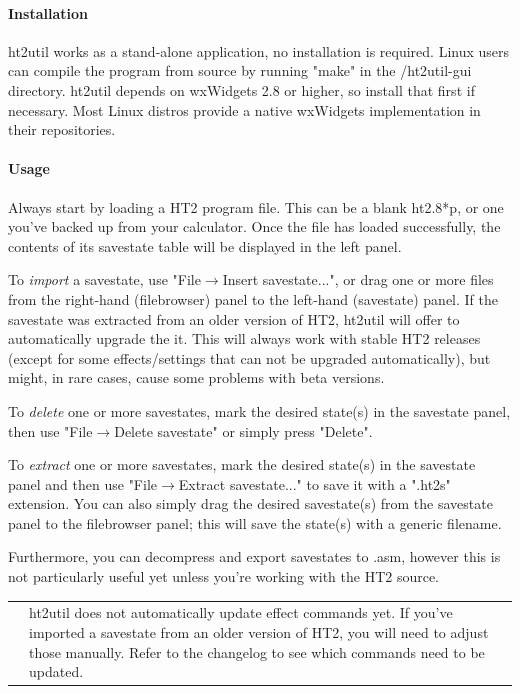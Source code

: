 \documentclass[12pt]{report}	%
\newcommand*{\TakeFourierOrnament}[1]{{%
\fontencoding{U}\fontfamily{futs}\selectfont\char#1}}
\newcommand*{\danger}{\TakeFourierOrnament{66}}
\begin{document}
\paragraph{Installation} ht2util works as a stand-alone application, no installation is required. Linux users can compile the program from source by running "make" in the /ht2util-gui directory. ht2util depends on wxWidgets 2.8 or higher, so install that first if necessary. Most Linux distros provide a native wxWidgets implementation in their repositories.

\paragraph{Usage} Always start by loading a HT2 program file. This can be a blank ht2.8*p, or one you've backed up from your calculator. Once the file has loaded successfully, the contents of its savestate table will be displayed in the left panel.

To \emph{import} a savestate, use "File$\rightarrow$Insert savestate...", or drag one or more files from the right-hand (filebrowser) panel to the left-hand (savestate) panel. If the savestate was extracted from an older version of HT2, ht2util will offer to automatically upgrade the it. This will always work with stable HT2 releases (except for some effects/settings that can not be upgraded automatically), but might, in rare cases, cause some problems with beta versions.

To \emph{delete} one or more savestates, mark the desired state(s) in the savestate panel, then use "File$\rightarrow$Delete savestate" or simply press "Delete".

To \emph{extract} one or more savestates, mark the desired state(s) in the savestate panel and then use "File$\rightarrow$Extract savestate..." to save it with a ".ht2s" extension. You can also simply drag the desired savestate(s) from the savestate panel to the filebrowser panel; this will save the state(s) with a generic filename.

Furthermore, you can decompress and export savestates to .asm, however this is not particularly useful yet unless you're working with the HT2 source. \newline

\begin{tabularx}{\textwidth}{m{} X}
\Huge{\textcolor{red}{\newline\danger}} & ht2util does not automatically update effect commands yet. If you've imported a savestate from an older version of HT2, you will need to adjust those manually. Refer to the changelog to see which commands need to be updated. \\
\end{tabularx} ~\\
\end{document}
